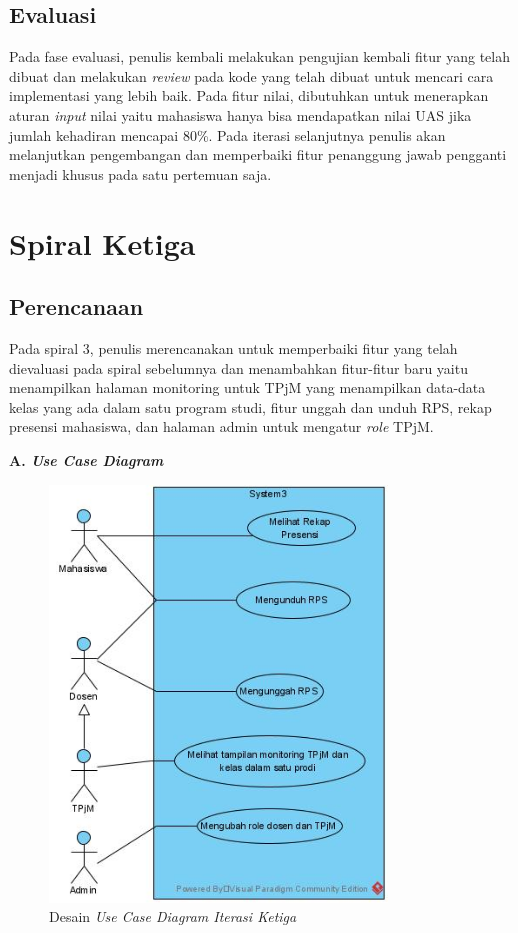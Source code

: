 \subsection{Evaluasi}
	Pada fase evaluasi, penulis kembali melakukan pengujian kembali fitur yang telah dibuat dan melakukan \textit{review} pada kode yang telah dibuat untuk mencari cara implementasi yang lebih baik. Pada fitur nilai, dibutuhkan untuk menerapkan aturan \textit{input} nilai yaitu mahasiswa hanya bisa mendapatkan nilai UAS jika jumlah kehadiran mencapai 80\%. Pada iterasi selanjutnya penulis akan melanjutkan pengembangan dan memperbaiki fitur penanggung jawab pengganti menjadi khusus pada satu pertemuan saja.

\section{Spiral Ketiga}		%
\subsection{Perencanaan}
	Pada spiral 3, penulis merencanakan untuk memperbaiki fitur yang telah dievaluasi pada spiral sebelumnya dan menambahkan fitur-fitur baru yaitu menampilkan halaman monitoring untuk TPjM yang menampilkan data-data kelas yang ada dalam satu program studi, fitur unggah dan unduh RPS, rekap presensi mahasiswa, dan halaman admin untuk mengatur \textit{role} TPjM.

\textbf{A. \textit{Use Case Diagram}}

\begin{figure}[h!]
	\centering
	\includegraphics[width=0.8\textwidth]{gambar/diagram/Use Case Iteration 3}
	\caption{Desain \textit{Use Case Diagram Iterasi Ketiga}}
	\label{fig:usecase3rd}
\end{figure}

